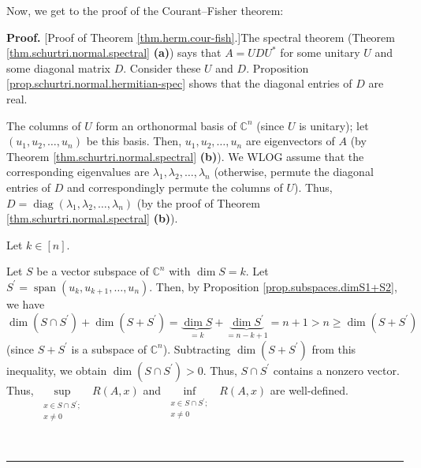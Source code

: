 \documentclass[numbers=enddot,12pt,final,onecolumn,notitlepage]{scrartcl}%
\numberwithin{exer}{subsection}
\theoremstyle{definition}
\newenvironment{proof}[1][Proof]{\noindent\textbf{#1.} }{\ \rule{0.5em}{0.5em}}
\begin{document}
Now, we get to the proof of the Courant--Fisher theorem:

\begin{proof}
[Proof of Theorem \ref{thm.herm.cour-fish}.]The spectral theorem (Theorem
\ref{thm.schurtri.normal.spectral} \textbf{(a)}) says that $A=UDU^{\ast}$ for
some unitary $U$ and some diagonal matrix $D$. Consider these $U$ and $D$.
Proposition \ref{prop.schurtri.normal.hermitian-spec} shows that the diagonal
entries of $D$ are real.

The columns of $U$ form an orthonormal basis of $\mathbb{C}^{n}$ (since $U$ is
unitary); let $\left(  u_{1},u_{2},\ldots,u_{n}\right)  $ be this basis. Then,
$u_{1},u_{2},\ldots,u_{n}$ are eigenvectors of $A$ (by Theorem
\ref{thm.schurtri.normal.spectral} \textbf{(b)}). We WLOG assume that the
corresponding eigenvalues are $\lambda_{1},\lambda_{2},\ldots,\lambda_{n}$
(otherwise, permute the diagonal entries of $D$ and correspondingly permute
the columns of $U$). Thus, $D=\operatorname*{diag}\left(  \lambda_{1}%
,\lambda_{2},\ldots,\lambda_{n}\right)  $ (by the proof of Theorem
\ref{thm.schurtri.normal.spectral} \textbf{(b)}).

Let $k\in\left[  n\right]  $.

Let $S$ be a vector subspace of $\mathbb{C}^{n}$ with $\dim S=k$. Let
$S^{\prime}=\operatorname*{span}\left(  u_{k},u_{k+1},\ldots,u_{n}\right)  $.
Then, by Proposition \ref{prop.subspaces.dimS1+S2}, we have%
\[
\dim\left(  S\cap S^{\prime}\right)  +\dim\left(  S+S^{\prime}\right)
=\underbrace{\dim S}_{=k}+\underbrace{\dim S^{\prime}}_{=n-k+1}=n+1>n\geq
\dim\left(  S+S^{\prime}\right)
\]
(since $S+S^{\prime}$ is a subspace of $\mathbb{C}^{n}$). Subtracting
$\dim\left(  S+S^{\prime}\right)  $ from this inequality, we obtain
$\dim\left(  S\cap S^{\prime}\right)  >0$. Thus, $S\cap S^{\prime}$ contains a
nonzero vector. Thus, $\sup\limits_{\substack{x\in S\cap S^{\prime};\\x\neq
0}}\ \ R\left(  A,x\right)  $ and $\inf\limits_{\substack{x\in S\cap
S^{\prime};\\x\neq0}}\ \ R\left(  A,x\right)  $ are well-defined.


\end{proof}
\end{document}
